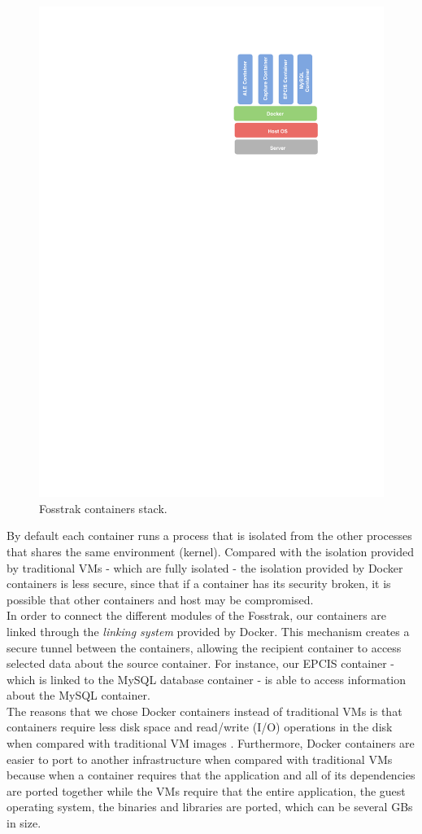 \begin{figure}[!ht]
\centering
\includegraphics[width=.3\textwidth]{./images/docker-stack}
\caption[Fosstrak containers stack.]{Fosstrak containers stack.}
\label{fig:impl_containers}
\end{figure}

By default each container runs a process that is isolated from the other processes that shares the same
environment (kernel). Compared with the isolation provided by traditional \glspl{VM} - which are fully
isolated - the isolation provided by Docker containers is less secure, since that if a container has
its security broken, it is possible that other containers and host may be compromised.\\

In order to connect the different modules of the Fosstrak, our containers are
linked through the \textit{linking system} provided by Docker. This mechanism creates a secure tunnel
between the containers, allowing the recipient container to access selected data about the source container.
For instance, our \gls{EPCIS} container - which is linked to the MySQL database container - is able to
access information about the MySQL container.\\

The reasons that we chose Docker containers instead of traditional \glspl{VM} is that containers
require less disk space and read/write (I/O) operations in the disk when compared with traditional
\gls{VM} images \cite{merkel2014docker}. Furthermore, Docker containers are easier to port to another
infrastructure when compared with traditional \glspl{VM} because when a container requires that the
application and all of its dependencies are ported together while the \glspl{VM} require that the
entire application, the guest operating system, the binaries and libraries are ported, which can be
several \glspl{GB} in size.

